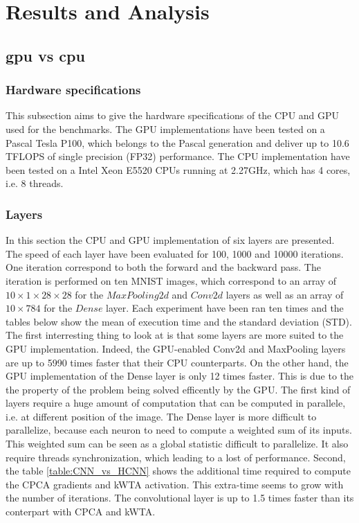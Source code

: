 \documentclass[11pt]{report}
\begin{document}
\chapter{Results and Analysis} \label{result_and_analysis}

\section{\acrshort{gpu} vs \acrshort{cpu}}

\subsection{Hardware specifications}

This subsection aims to give the hardware specifications of the CPU and GPU used for the benchmarks. The GPU implementations have been tested on a Pascal Tesla P100, which belongs to the Pascal generation and deliver up to 10.6 TFLOPS of single precision (FP32) performance. The CPU implementation have been tested on a Intel Xeon E5520 CPUs running at 2.27GHz, which has 4 cores, i.e. 8 threads.

\subsection{Layers}

In this section the CPU and GPU implementation of six layers are presented. The speed of each layer have been evaluated for 100, 1000 and 10000 iterations. One iteration correspond to both the forward and the backward pass. The iteration is performed on ten MNIST images, which correspond to an array of $10\times1\times28\times28$ for the $MaxPooling2d$ and $Conv2d$ layers as well as an array of $10\times784$ for the $Dense$ layer. Each experiment have been ran ten times and the tables below show the mean of execution time and the standard deviation (STD).
\newline
\newline
\noindent The first interresting thing to look at is that some layers are more suited to the GPU implementation. Indeed, the GPU-enabled Conv2d and MaxPooling layers are up to 5990 times faster that their CPU counterparts. On the other hand, the GPU implementation of the Dense layer is only 12 times faster. This is due to the the property of the problem being solved efficently by the GPU. The first kind of layers require a huge amount of  computation that can be computed in parallele, i.e. at different position of the image. The Dense layer is more difficult to parallelize, because each neuron to need to compute a weighted sum of its inputs. This weighted sum can be seen as a global statistic difficult to parallelize. It also require threads synchronization, which leading to a lost of performance.
\newline
\newline
\noindent Second, the table \ref{table:CNN_vs_HCNN} shows the additional time required to compute the CPCA gradients and kWTA activation. This extra-time seems to grow with the number of iterations. The convolutional layer is up to 1.5 times faster than its conterpart with CPCA and kWTA.
\end{document}
